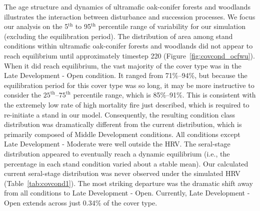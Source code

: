 The age structure and dynamics of ultramafic oak-conifer forests and woodlands illustrates the interaction between disturbance and succession processes. We focus our analysis on the 5$^{\text{th}}$ to 95$^{\text{th}}$ percentile range of variability for our simulation (excluding the equilibration period). %
%
The distribution of area among stand conditions within ultramafic oak-conifer forests and woodlands did not appear to reach equilibrium until approximately timestep 220 (Figure~\ref{fig:covcond_ocfwu}). When it did reach equilibrium, the vast majority of the cover type was in the Late Development - Open condition. It ranged from 71\%--94\%, but because the equilibration period for this cover type was so long, it may be more instructive to consider the $25^{\text{th}}$--$75^{\text{th}}$ percentile range, which is 85\%--91\%. This is consistent with the extremely low rate of high mortality fire just described, which is required to re-initiate a stand in our model. Consequently, the resulting condition class distribution was dramatically different from the current distribution, which is primarily composed of Middle Development conditions. All conditions except Late Development - Moderate were well outside the HRV. %
%
The seral-stage distribution appeared to eventually reach a dynamic equilibrium (i.e., the percentage in each stand condition varied about a stable mean). Our calculated current seral-stage distribution was never observed under the simulated HRV (Table~\ref{tab:covcond1}). The most striking departure was the dramatic shift away from all conditions to Late Development - Open. Currently, Late Development - Open extends across just 0.34\% of the cover type. 

